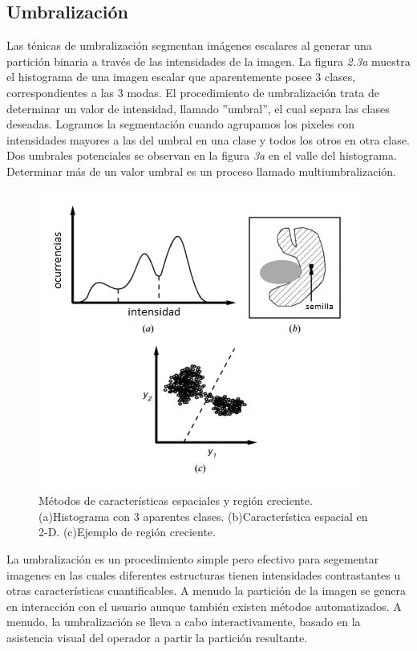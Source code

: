 \documentclass[12pt]{report}
\begin{document}
\subsection{Umbralización}
Las ténicas de umbralización segmentan imágenes escalares al generar una partición binaria a través de las intensidades de la imagen. La figura \textit{2.3a} muestra el histograma de una imagen escalar que aparentemente posee 3 clases, correspondientes a las 3 modas. El procedimiento de umbralización trata de determinar un valor de intensidad, llamado ''umbral'', el cual separa las clases deseadas. Logramos la segmentación cuando agrupamos los pixeles con intensidades mayores a las del umbral en una clase y todos los otros en otra clase. Dos umbrales potenciales se observan en la figura \textit{3a} en el valle del histograma. Determinar más de un valor umbral es un proceso llamado multiumbralización.\\

\begin{figure}[H]
\centering
\includegraphics[width = 10 cm, height = 10 cm]{umbral}
\caption{Métodos de características espaciales y región creciente. (a)Histograma con 3 aparentes clases. (b)Característica espacial en 2-D. (c)Ejemplo de región creciente.}
\end{figure}

La umbralización es un procedimiento simple pero efectivo para segementar imagenes en las cuales diferentes estructuras tienen intensidades contrastantes u otras características cuantificables. A menudo la partición de la imagen se genera en interacción con el usuario aunque también existen métodos automatizados. A menudo, la umbralización se lleva a cabo interactivamente, basado en la asistencia visual del operador a partir la partición resultante.
\end{document}
